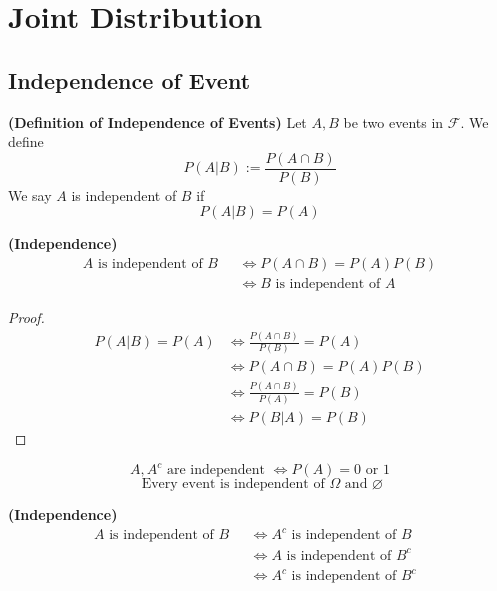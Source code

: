\documentclass{report}
\begin{document}
\chapter{Joint Distribution}
\section{Independence of Event}
\begin{definition}
\label{3.1.1}
\textbf{(Definition of Independence of Events)} Let $A,B$ be two events in  $\mathcal{F}$. We define
\begin{equation*}
P\left(A|B \right):=\frac{P\left(A\cap B \right)}{P\left(B \right)}
\end{equation*}
We say $A$ is independent of $B$ if 
\begin{equation*}
P\left( A|B\right)=P\left(A \right)
\end{equation*}
\end{definition}
\begin{theorem}
\label{3.1.2}
\textbf{(Independence)}
\begin{align*}
  A\text{ is independent of $B$ }&\iff  P\left(A\cap B \right)=P\left(A \right)P\left(B \right)\\
  &\iff B\text{ is independent of $A$ }
\end{align*}
\end{theorem}
\begin{proof}
\begin{align*}
  P\left( A|B\right)=P\left(A \right)&\iff \frac{P\left(A\cap B \right)}{P\left(B \right)}=P\left(A \right)\\
  &\iff P\left(A\cap B \right)=P\left(A \right)P\left(B \right)\\
  &\iff \frac{P\left(A\cap B \right)}{P\left(A \right)}=P\left(B \right)\\
  &\iff P\left(B|A\right)=P\left(B \right)
\end{align*}
\end{proof}
\begin{corollary}
\label{3.1.3}
\begin{equation*}
A,A^c\text{ are independent }\iff P\left(A \right)=0\text{ or }1
\end{equation*}
\begin{equation*}
\text{ Every event is independent of  }\Omega\text{ and }\varnothing
\end{equation*}
\end{corollary}
\begin{corollary}
\label{3.1.4}
\textbf{(Independence)} 
\begin{align}
  A\text{ is independent of $B$ }&\iff  A^c\text{ is independent of $B$ }\\
  &\iff A\text{ is independent of }B^c\\
  &\iff A^c\text{ is independent of $B^c$ }
\end{align}
\end{corollary}
\end{document}
